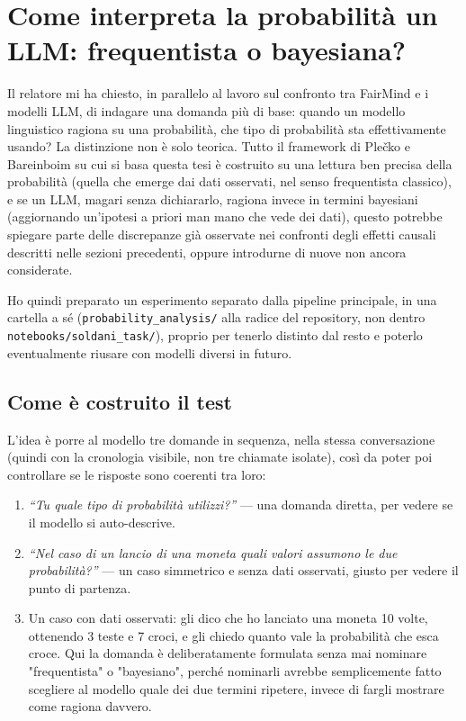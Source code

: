 \section{Come interpreta la probabilità un LLM: frequentista o bayesiana?}
\label{sec:prob-interpretation}

Il relatore mi ha chiesto, in parallelo al lavoro sul confronto tra FairMind e i modelli LLM, di indagare una domanda più di base: quando un modello linguistico ragiona su una probabilità, che tipo di probabilità sta effettivamente usando? La distinzione non è solo teorica. Tutto il framework di Ple\v{c}ko e Bareinboim su cui si basa questa tesi è costruito su una lettura ben precisa della probabilità (quella che emerge dai dati osservati, nel senso frequentista classico), e se un LLM, magari senza dichiararlo, ragiona invece in termini bayesiani (aggiornando un'ipotesi a priori man mano che vede dei dati), questo potrebbe spiegare parte delle discrepanze già osservate nei confronti degli effetti causali descritti nelle sezioni precedenti, oppure introdurne di nuove non ancora considerate.

Ho quindi preparato un esperimento separato dalla pipeline principale, in una cartella a sé (\texttt{probability\_analysis/} alla radice del repository, non dentro \texttt{notebooks/soldani\_task/}), proprio per tenerlo distinto dal resto e poterlo eventualmente riusare con modelli diversi in futuro.

\subsection*{Come è costruito il test}

L'idea è porre al modello tre domande in sequenza, nella stessa conversazione (quindi con la cronologia visibile, non tre chiamate isolate), così da poter poi controllare se le risposte sono coerenti tra loro:

\begin{enumerate}
  \item \emph{``Tu quale tipo di probabilità utilizzi?''} --- una domanda diretta, per vedere se il modello si auto-descrive.
  \item \emph{``Nel caso di un lancio di una moneta quali valori assumono le due probabilità?''} --- un caso simmetrico e senza dati osservati, giusto per vedere il punto di partenza.
  \item Un caso con dati osservati: gli dico che ho lanciato una moneta 10 volte, ottenendo 3 teste e 7 croci, e gli chiedo quanto vale la probabilità che esca croce. Qui la domanda è deliberatamente formulata senza mai nominare "frequentista" o "bayesiano", perché nominarli avrebbe semplicemente fatto scegliere al modello quale dei due termini ripetere, invece di fargli mostrare come ragiona davvero.
\end{enumerate}

